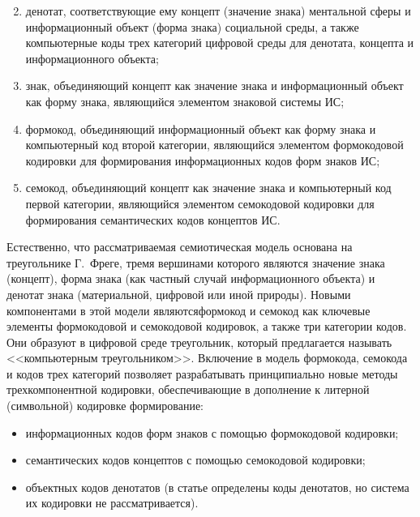 \begin{multicols}{2}

\noindent
\begin{enumerate}[(1)]
\setcounter{enumi}{1}
\item денотат, соответствующие ему концепт (значение знака) ментальной сферы и 
информационный объект (форма знака) социальной среды, а также компьютерные 
коды трех категорий цифровой среды для денотата, концепта и информационного 
объекта;
\item знак, объединяющий концепт как значение знака и информационный объект 
как форму знака, являющийся элементом знаковой сис\-те\-мы ИС;
\item формокод, объединяющий информационный объект как форму знака и 
компьютерный код второй категории, являющийся элементом формокодовой 
кодировки для формирования информационных кодов форм знаков ИС;
\item семокод, объединяющий концепт как значение знака и компьютерный код 
первой категории, являющийся элементом семокодовой кодировки для 
формирования семантических кодов концептов ИС.
\end{enumerate}
  
   Естественно, что рассматриваемая семиотическая модель основана на треугольнике 
Г.~Фреге, тремя вершинами которого являются значение знака (концепт), форма знака (как 
частный случай информационного объекта) и денотат знака (ма\-териальной, цифровой или 
иной природы). Новыми компонентами в этой модели являются\linebreak формокод и семокод как 
ключевые элементы формокодовой и семокодовой кодировок, а также три категории %
 кодов. 
Они образуют в цифровой среде треугольник, который предлагается называть 
<<компьютерным треугольником>>. Включение в модель формокода, семокода и кодов трех 
категорий %
 позволяет разрабатывать принципиально новые методы трехкомпонентной 
кодировки, обеспечивающие в дополнение к литерной (символьной) кодировке 
формирование:
   \begin{itemize}
\item информационных кодов форм знаков с по\-мощью формокодовой кодировки;
\item семантических кодов концептов с помощью семокодовой кодировки;
\item объектных кодов денотатов (в статье определены коды денотатов, но система 
их кодировки не рассматривается).
\end{itemize}


\end{multicols}
